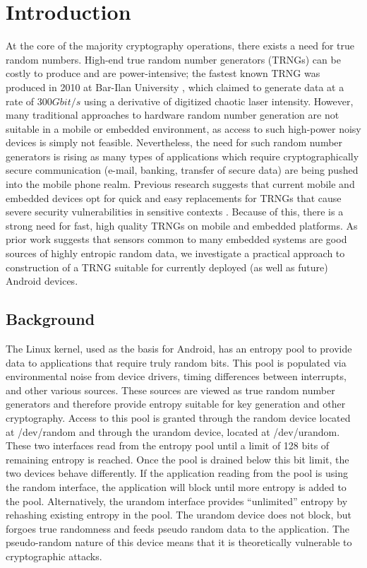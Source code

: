 \documentclass[conference]{IEEEtran}
\begin{document}
\section{Introduction}
At the core of the majority cryptography operations, there exists a need for true random numbers. 
High-end true random number generators (TRNGs) can be costly to produce and are power-intensive; the fastest known TRNG was produced
in 2010 at Bar-Ilan University \cite{kanter}, which claimed to generate data at a rate of $300 Gbit/s$ using a derivative
of digitized chaotic laser intensity. However, many traditional approaches to hardware random number generation are not suitable in a
mobile or embedded environment, as access to such high-power noisy devices is simply not feasible. Nevertheless, the need for such
random number generators is rising as many types of applications which require cryptographically secure communication (e-mail, banking,
transfer of secure data) are being pushed into the mobile phone realm.  Previous research suggests that current mobile and embedded
devices opt for quick and easy replacements for TRNGs that cause severe security vulnerabilities in sensitive contexts \cite{chip_and_skim}.
Because of this, there is a strong need for fast, high quality TRNGs on mobile and embedded platforms.  As prior work suggests that
sensors common to many embedded systems are good sources of highly entropic random data, we investigate a practical approach to
construction of a TRNG suitable for currently deployed (as well as future) Android devices.

\subsection{Background}
The Linux kernel, used as the basis for Android, has an entropy pool to provide data to applications that require truly random bits.
This pool is populated via environmental noise from device drivers, timing differences between interrupts, and other various
sources. These sources are viewed as true random number generators and therefore provide entropy suitable for key generation and other
cryptography. Access to this pool is granted through the random device located at /dev/random \cite{random_man} and through the urandom device, 
located at /dev/urandom. These two interfaces read from the entropy pool until a limit of 128 bits of remaining entropy is reached. Once
the pool is drained below this bit limit, the two devices behave differently.  If the application reading from the pool is using the random
interface, the application will block until more entropy is added to the pool. Alternatively, the urandom interface provides ``unlimited''
entropy by rehashing existing entropy in the pool. The urandom device does not block, but forgoes true randomness and feeds pseudo random
data to the application. The pseudo-random nature of this device means that it is theoretically vulnerable to cryptographic attacks.
\end{document}
